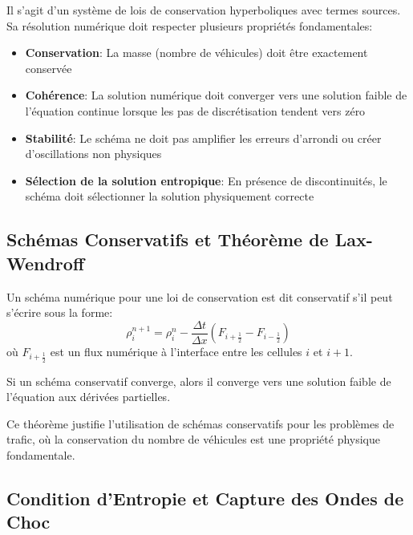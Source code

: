 Il s'agit d'un système de lois de conservation hyperboliques avec termes sources. Sa résolution numérique doit respecter plusieurs propriétés fondamentales:

\begin{itemize}
    \item \textbf{Conservation}: La masse (nombre de véhicules) doit être exactement conservée
    \item \textbf{Cohérence}: La solution numérique doit converger vers une solution faible de l'équation continue lorsque les pas de discrétisation tendent vers zéro
    \item \textbf{Stabilité}: Le schéma ne doit pas amplifier les erreurs d'arrondi ou créer d'oscillations non physiques
    \item \textbf{Sélection de la solution entropique}: En présence de discontinuités, le schéma doit sélectionner la solution physiquement correcte
\end{itemize}

\subsection{Schémas Conservatifs et Théorème de Lax-Wendroff}
\label{subsec:schemas_conservatifs}

\begin{definition}
Un schéma numérique pour une loi de conservation est dit conservatif s'il peut s'écrire sous la forme:
\begin{equation}
\rho_i^{n+1} = \rho_i^n - \frac{\Delta t}{\Delta x}\left(F_{i+\frac{1}{2}} - F_{i-\frac{1}{2}}\right)
\end{equation}
où $F_{i+\frac{1}{2}}$ est un flux numérique à l'interface entre les cellules $i$ et $i+1$.
\end{definition}

\begin{theorem}
Si un schéma conservatif converge, alors il converge vers une solution faible de l'équation aux dérivées partielles.
\end{theorem}

Ce théorème justifie l'utilisation de schémas conservatifs pour les problèmes de trafic, où la conservation du nombre de véhicules est une propriété physique fondamentale.

\subsection{Condition d'Entropie et Capture des Ondes de Choc}
\label{subsec:condition_entropie}

